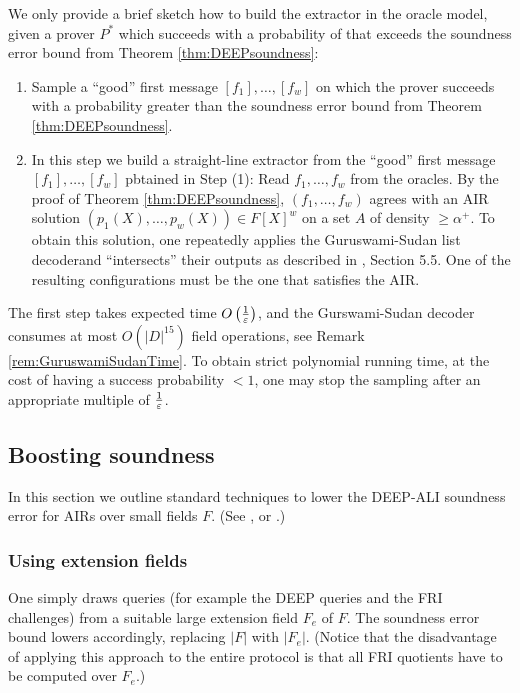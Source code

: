 \documentclass[11pt]{article}
\theoremstyle{definition}
\theoremstyle{remark}
\begin{document}
We only provide a brief sketch how to build the extractor in the oracle model, given a prover $P^*$ which succeeds with a probability of that exceeds the soundness error bound from Theorem \ref{thm:DEEPsoundness}:
\begin{enumerate}
\item
Sample a ``good'' first message $[f_1],\ldots , [f_w]$ on which the prover succeeds with a probability greater than the soundness error bound from Theorem \ref{thm:DEEPsoundness}.

\item
In this step we build a straight-line extractor from the ``good'' first message $[f_1],\ldots , [f_w]$ pbtained in Step (1):
Read $f_1, \ldots ,f_w$ from the oracles. 
By the proof of Theorem \ref{thm:DEEPsoundness}, $(f_1,\ldots ,f_w)$ agrees with an AIR solution $(p_1(X),\ldots ,p_w(X))\in F[X]^w$ on a set $A$ of density $\geq \alpha^+$. 
To obtain this solution, one repeatedly applies the Guruswami-Sudan list decoder\footnotemark and   ``intersects'' their outputs as described in \cite{ethSTARK}, Section 5.5.
One of the resulting configurations must be the one that satisfies the AIR.
%
\end{enumerate}

The first step takes expected time $O\left(\nicefrac{1}{\varepsilon}\right)$, and the Gurswami-Sudan decoder consumes at most $O\left(|D|^{15}\right)$ field operations, see Remark \ref{rem:GuruswamiSudanTime}.
To obtain strict polynomial running time, at the cost of having a success probability $<1$, one may stop the sampling after an appropriate multiple of $\nicefrac{1}{\varepsilon}$.
 
\subsection{Boosting soundness}
In this section we outline standard techniques to lower the DEEP-ALI soundness error for AIRs over small fields $F$. 
(See \cite{ethSTARK}, or \cite{PolygonZero}.)

\subsubsection{Using extension fields}
One simply draws queries (for example the DEEP queries and the FRI challenges) from a suitable large extension field $F_e$ of $F$.
The soundness error bound lowers accordingly, replacing $|F|$ with $|F_e|$. 
(Notice that the disadvantage of applying this approach to the entire protocol is that all FRI quotients have to be computed over $F_e$.)
 
\end{document}

